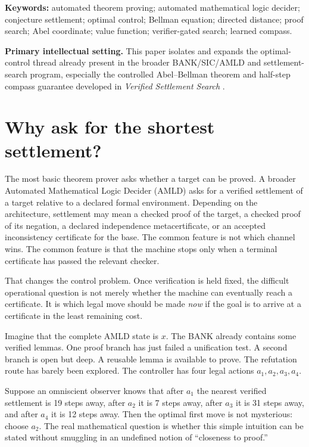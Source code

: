 \documentclass[11pt,letterpaper]{article}
\theoremstyle{remark}
\begin{document}
\noindent\textbf{Keywords:} automated theorem proving; automated mathematical logic decider; conjecture settlement; optimal control; Bellman equation; directed distance; proof search; Abel coordinate; value function; verifier-gated search; learned compass.

\medskip
\noindent\textbf{Primary intellectual setting.} This paper isolates and expands the optimal-control thread already present in the broader BANK/SIC/AMLD and settlement-search program, especially the controlled Abel--Bellman theorem and half-step compass guarantee developed in \emph{Verified Settlement Search} \cite{VSS}.

\clearpage
\tableofcontents
\clearpage

\section{Why ask for the shortest settlement?}

The most basic theorem prover asks whether a target can be proved. A broader Automated Mathematical Logic Decider (AMLD) asks for a verified settlement of a target relative to a declared formal environment. Depending on the architecture, settlement may mean a checked proof of the target, a checked proof of its negation, a declared independence metacertificate, or an accepted inconsistency certificate for the base. The common feature is not which channel wins. The common feature is that the machine stops only when a terminal certificate has passed the relevant checker.

That changes the control problem. Once verification is held fixed, the difficult operational question is not merely whether the machine can eventually reach a certificate. It is which legal move should be made \emph{now} if the goal is to arrive at a certificate in the least remaining cost.

\begin{storybox}
Imagine that the complete AMLD state is $x$. The BANK already contains some verified lemmas. One proof branch has just failed a unification test. A second branch is open but deep. A reusable lemma is available to prove. The refutation route has barely been explored. The controller has four legal actions $a_1,a_2,a_3,a_4$.

Suppose an omniscient observer knows that after $a_1$ the nearest verified settlement is 19 steps away, after $a_2$ it is 7 steps away, after $a_3$ it is 31 steps away, and after $a_4$ it is 12 steps away. Then the optimal first move is not mysterious: choose $a_2$. The real mathematical question is whether this simple intuition can be stated without smuggling in an undefined notion of ``closeness to proof.''
\end{storybox}
\end{document}
